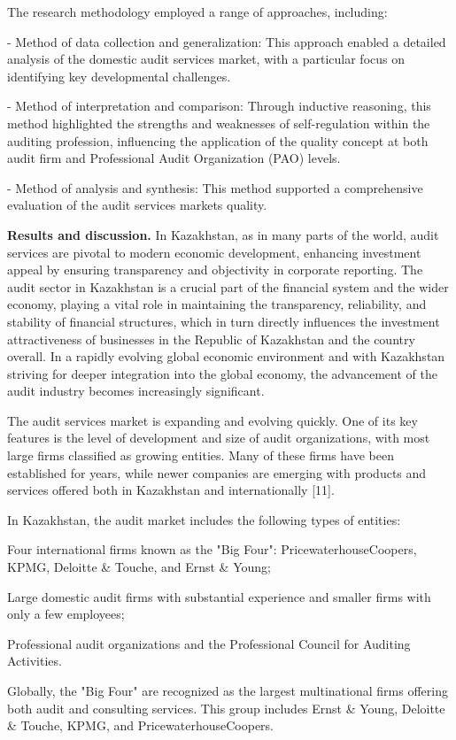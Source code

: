 \begin{multicols}{2}
The research methodology employed a range of approaches, including:

- Method of data collection and generalization: This approach enabled a
detailed analysis of the domestic audit services market, with a
particular focus on identifying key developmental challenges.

- Method of interpretation and comparison: Through inductive reasoning,
this method highlighted the strengths and weaknesses of self-regulation
within the auditing profession, influencing the application of the
quality concept at both audit firm and Professional Audit Organization
(PAO) levels.

- Method of analysis and synthesis: This method supported a
comprehensive evaluation of the audit services market\textquotesingle s
quality.

\textbf{Results and discussion.} In Kazakhstan, as in many parts of the
world, audit services are pivotal to modern economic development,
enhancing investment appeal by ensuring transparency and objectivity in
corporate reporting. The audit sector in Kazakhstan is a crucial part of
the financial system and the wider economy, playing a vital role in
maintaining the transparency, reliability, and stability of financial
structures, which in turn directly influences the investment
attractiveness of businesses in the Republic of Kazakhstan and the
country overall. In a rapidly evolving global economic environment and
with Kazakhstan striving for deeper integration into the global economy,
the advancement of the audit industry becomes increasingly significant.

The audit services market is expanding and evolving quickly. One of its
key features is the level of development and size of audit
organizations, with most large firms classified as growing entities.
Many of these firms have been established for years, while newer
companies are emerging with products and services offered both in
Kazakhstan and internationally {[}11{]}.

In Kazakhstan, the audit market includes the following types of
entities:

Four international firms known as the "Big Four":
PricewaterhouseCoopers, KPMG, Deloitte \& Touche, and Ernst \& Young;

Large domestic audit firms with substantial experience and smaller firms
with only a few employees;

Professional audit organizations and the Professional Council for
Auditing Activities.

Globally, the "Big Four" are recognized as the largest multinational
firms offering both audit and consulting services. This group includes
Ernst \& Young, Deloitte \& Touche, KPMG, and PricewaterhouseCoopers.
\end{multicols}

